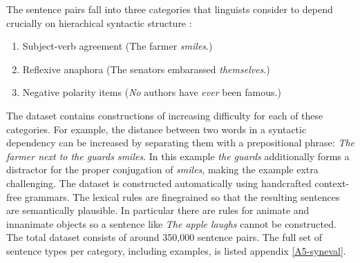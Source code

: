     The sentence pairs fall into three categories that linguists consider to depend crucially on hierachical syntactic structure \citep{everaert2015structures,xiang2009illusory}:
      \begin{enumerate}[noitemsep]
        \item Subject-verb agreement (The farmer \textit{smiles}.)
        \item Reflexive anaphora (The senators embarassed \textit{themselves}.)
        \item Negative polarity items (\textit{No} authors have \textit{ever} been famous.)
      \end{enumerate}
    The dataset contains constructions of increasing difficulty for each of these categories. For example, the distance between two words in a syntactic dependency can be increased by separating them with a prepositional phrase: \textit{The farmer next to the guards smiles}. In this example \textit{the guards} additionally forms a distractor for the proper conjugation of \textit{smiles}, making the example extra challenging. The dataset is constructed automatically using handcrafted context-free grammars. The lexical rules are finegrained so that the resulting sentences are semantically plausible. In particular there are rules for animate and innanimate objects so a sentence like \textit{The apple laughs} cannot be constructed. The total dataset consists of around 350,000 sentence pairs. The full set of sentence types per category, including examples, is listed appendix \ref{A5-syneval}.

